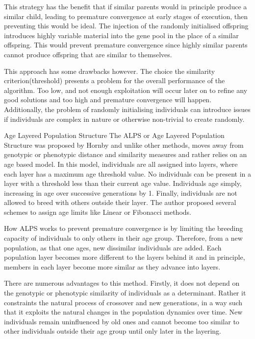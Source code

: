 \documentclass[12pt]{article}
\begin{document}
This strategy has the benefit that if similar parents would in principle produce a similar child, leading to premature convergence at early stages of execution, then preventing this would be ideal. The injection of the randomly initialised offspring introduces highly variable material into the gene pool in the place of a similar offspring. This would prevent premature convergence since highly similar parents cannot produce offspring that are similar to themselves.

This approach has some drawbacks however. The choice the similarity criterion(threshold) presents a problem for the overall performance of the algorithm. Too low, and not enough exploitation will occur later on to refine any good solutions and too high and premature convergence will happen. Additionally, the problem of randomly initialising individuals can introduce issues if individuals are complex in nature or otherwise non-trivial to create randomly.

Age Layered Population Structure
The ALPS or Age Layered Population Structure was proposed by Hornby \cite{Hornby2006} and unlike other methods, moves away from genotypic or phenotypic distance and similarity measures and rather relies on an age based model. In this model, individuals are all assigned into layers, where each layer has a maximum age threshold value. No individuals can be present in a layer with a threshold less than their current age value. Individuals age simply, increasing in age over successive	generations by 1. Finally, individuals are not allowed to breed with others outside their layer. The author proposed several schemes to assign age limits like Linear or Fibonacci methods. 

How ALPS works to prevent premature convergence is by limiting the breeding capacity of individuals to only others in their age group. Therefore, from a new population, as that one ages, new dissimilar individuals are added. Each population layer becomes more different to the layers behind it and in principle, members in each layer become more similar as they advance into layers.

There are numerous advantages to this method. Firstly, it does not depend on the genotypic or phenotypic similarity	of individuals as a determinant. Rather it constraints the natural process of crossover and new generations, in a way such that it exploits the natural changes in the population dynamics over time. New individuals remain uninfluenced by old ones and cannot become too similar to other individuals outside their age group until only later in the layering.
\end{document}
